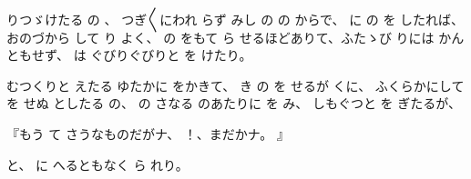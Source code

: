 
りつゞけたる
の
、
つぎ〳〵にわれ
らず
みし
の
の
からで、
に
の
を
したれば、
おのづから
して
り
よく、
の
をもて
ら
せるほどありて、ふたゝび
りには
かんともせず、
は
ぐびりぐびりと
を
けたり。

むつくりと
えたる
ゆたかに
をかきて、
き
の
を
せるが
くに、
ふくらかにして
を
せぬ
としたる
の、
の
さなる
のあたりに
を
み、
しもぐつと
を
ぎたるが、

『もう
て
さうなものだがナ、
！、まだかナ。
』

と、
に
へるともなく
ら
れり。

